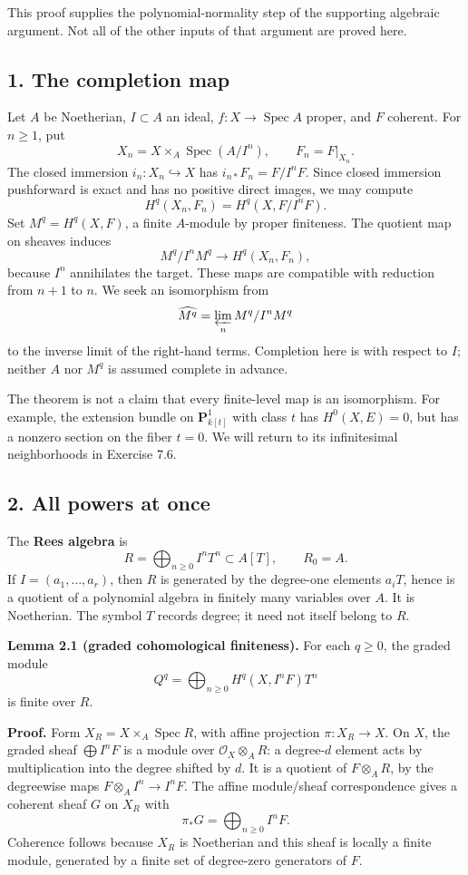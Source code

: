 \documentclass[11pt]{article}
\begin{document}
This proof supplies the polynomial-normality step of the supporting
algebraic argument. Not all of the other inputs of that argument are
proved here.

\subsection{1. The completion map}\label{the-completion-map}

Let \(A\) be Noetherian, \(I\subset A\) an ideal,
\(f:X\to\operatorname{Spec}A\) proper, and \(F\) coherent. For
\(n\geq1\), put \[
X_n=X\times_A\operatorname{Spec}(A/I^n),\qquad F_n=F|_{X_n}.
\] The closed immersion \(i_n:X_n\hookrightarrow X\) has
\(i_{n*}F_n=F/I^nF\). Since closed immersion pushforward is exact and
has no positive direct images, we may compute \[
H^q(X_n,F_n)=H^q(X,F/I^nF).
\] Set \(M^q=H^q(X,F)\), a finite \(A\)-module by proper finiteness. The
quotient map on sheaves induces \[
M^q/I^nM^q\longrightarrow H^q(X_n,F_n),
\] because \(I^n\) annihilates the target. These maps are compatible
with reduction from \(n+1\) to \(n\). We seek an isomorphism from \[
\widehat{M^q}=\varprojlim_n M^q/I^nM^q
\] to the inverse limit of the right-hand terms. Completion here is with
respect to \(I\); neither \(A\) nor \(M^q\) is assumed complete in
advance.

The theorem is not a claim that every finite-level map is an
isomorphism. For example, the extension bundle on \(\mathbf P^1_{k[t]}\)
with class \(t\) has \(H^0(X,E)=0\), but has a nonzero section on the
fiber \(t=0\). We will return to its infinitesimal neighborhoods in
Exercise 7.6.

\subsection{2. All powers at once}\label{all-powers-at-once}

The \textbf{Rees algebra} is \[
R=\bigoplus_{n\geq0}I^nT^n\subset A[T],\qquad R_0=A.
\] If \(I=(a_1,\ldots,a_r)\), then \(R\) is generated by the degree-one
elements \(a_iT\), hence is a quotient of a polynomial algebra in
finitely many variables over \(A\). It is Noetherian. The symbol \(T\)
records degree; it need not itself belong to \(R\).

\textbf{Lemma 2.1 (graded cohomological finiteness).} For each
\(q\geq0\), the graded module \[
Q^q=\bigoplus_{n\geq0}H^q(X,I^nF)T^n
\] is finite over \(R\).

\textbf{Proof.} Form \(X_R=X\times_A\operatorname{Spec}R\), with affine
projection \(\pi:X_R\to X\). On \(X\), the graded sheaf
\(\bigoplus I^nF\) is a module over \(\mathcal O_X\otimes_A R\): a
degree-\(d\) element acts by multiplication into the degree shifted by
\(d\). It is a quotient of \(F\otimes_A R\), by the degreewise maps
\(F\otimes_A I^n\to I^nF\). The affine module/sheaf correspondence gives
a coherent sheaf \(G\) on \(X_R\) with \[
\pi_*G=\bigoplus_{n\geq0}I^nF.
\] Coherence follows because \(X_R\) is Noetherian and this sheaf is
locally a finite module, generated by a finite set of degree-zero
generators of \(F\).
\end{document}
